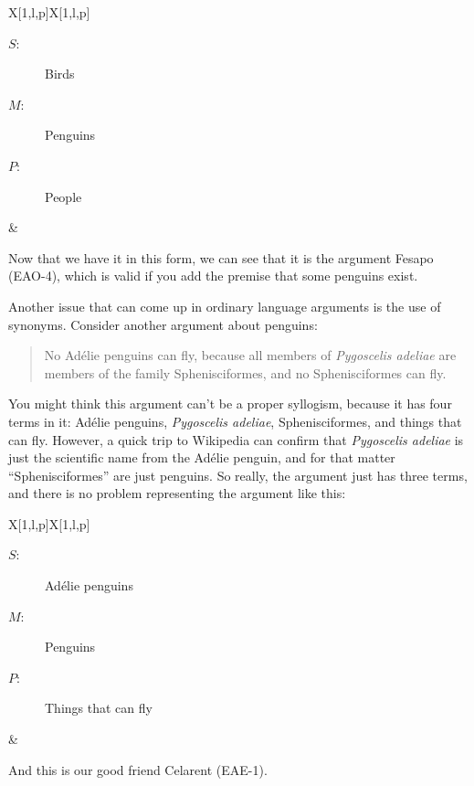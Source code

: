 \begin{tabu}{{X[1,l,p]X[1,l,p]}}
\begin{description}
\item[$S$:] Birds
\item[$M$:] Penguins
\item[$P$:] People
\end{description}
&
\begin{kormanize}
\end{kormanize}
\end{tabu}

Now that we have it in this form, we can see that it is the argument Fesapo (EAO-4), which is valid if you add the premise that some penguins exist.

Another issue that can come up in ordinary language arguments is the use of synonyms. Consider another argument about penguins:

\begin{quotation}
\noindent No Ad\'{e}lie penguins can fly, because all members of \emph{Pygoscelis adeliae} are members of the family Sphenisciformes, and no Sphenisciformes can fly.
\end{quotation}

You might think this argument can't be a proper syllogism, because it has four terms in it: Ad\'{e}lie penguins, \emph{Pygoscelis adeliae}, Sphenisciformes, and things that can fly. However, a quick trip to Wikipedia can confirm that \emph{Pygoscelis adeliae} is just the scientific name from the Ad\'{e}lie penguin, and for that matter ``Sphenisciformes'' are just penguins. So really, the argument just has three terms, and there is no problem representing the argument  like this:

\begin{tabu}{{X[1,l,p]X[1,l,p]}}
\begin{description}
\item[$S$:] Ad\'{e}lie penguins
\item[$M$:] Penguins
\item[$P$:] Things that can fly
\end{description}
&
\begin{kormanize}
\end{kormanize}
\end{tabu}

And this is our good friend Celarent (EAE-1).

